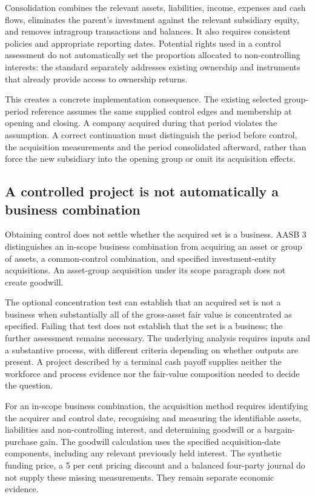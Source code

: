 Consolidation combines the relevant assets, liabilities, income, expenses and cash flows, eliminates the parent's investment against the relevant subsidiary equity, and removes intragroup transactions and balances. It also requires consistent policies and appropriate reporting dates.\citep[paras.~B86--B93]{aasb10control2026} Potential rights used in a control assessment do not automatically set the proportion allocated to non-controlling interests: the standard separately addresses existing ownership and instruments that already provide access to ownership returns.\citep[paras.~B89--B91]{aasb10control2026}

This creates a concrete implementation consequence. The existing selected group-period reference assumes the same supplied control edges and membership at opening and closing. A company acquired during that period violates the assumption. A correct continuation must distinguish the period before control, the acquisition measurements and the period consolidated afterward, rather than force the new subsidiary into the opening group or omit its acquisition effects.

\subsection{A controlled project is not automatically a business combination}

Obtaining control does not settle whether the acquired set is a business. AASB 3 distinguishes an in-scope business combination from acquiring an asset or group of assets, a common-control combination, and specified investment-entity acquisitions. An asset-group acquisition under its scope paragraph does not create goodwill.\citep[paras.~2--3]{aasb3scope2026}

The optional concentration test can establish that an acquired set is not a business when substantially all of the gross-asset fair value is concentrated as specified. Failing that test does not establish that the set is a business; the further assessment remains necessary. The underlying analysis requires inputs and a substantive process, with different criteria depending on whether outputs are present.\citep[paras.~B7A--B12D]{aasb3scope2026} A project described by a terminal cash payoff supplies neither the workforce and process evidence nor the fair-value composition needed to decide the question.

For an in-scope business combination, the acquisition method requires identifying the acquirer and control date, recognising and measuring the identifiable assets, liabilities and non-controlling interest, and determining goodwill or a bargain-purchase gain. The goodwill calculation uses the specified acquisition-date components, including any relevant previously held interest.\citep[paras.~4--10, 32--33]{aasb3scope2026} The synthetic funding price, a 5 per cent pricing discount and a balanced four-party journal do not supply these missing measurements. They remain separate economic evidence.


